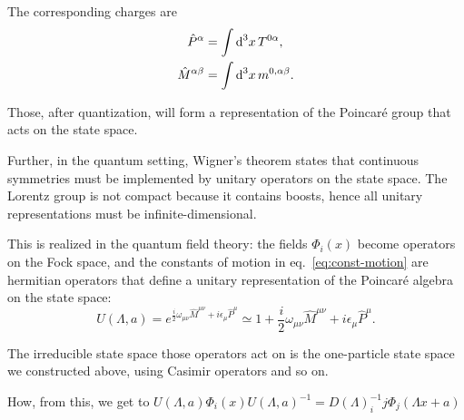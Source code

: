 The corresponding charges are
\begin{subequations}\label{eq:const-motion}
\begin{align}
    \hat{P}^\alpha &= \int {\mathop{}\!\mathrm{d}}^3 x \, T^{0\alpha} , \\
   \hat{M}^{\alpha\beta} &= \int {\mathop{}\!\mathrm{d}}^3 x \, m^{0 ,\alpha\beta} .
\end{align}
\end{subequations}

Those, after quantization, will form a representation of the Poincaré group that acts on the state space.

Further, in the quantum setting, Wigner's theorem states that continuous symmetries must be implemented by unitary operators on the state space. The Lorentz group is not compact because it contains boosts, hence all unitary representations must be infinite-dimensional. 

This is realized in the quantum field theory: the fields $\Phi_i(x)$ become operators on the Fock space, and the constants of motion in eq.~\eqref{eq:const-motion} are hermitian operators that define a unitary representation of the Poincaré algebra on the state space:
\begin{equation}
    U(\Lambda,a) = e^{\frac{i}{2} \omega_{\mu\nu} \hat{M}^{\mu\nu} + i \epsilon_\mu \hat{P}^\mu} \simeq 1 + \frac{i}{2} \omega_{\mu\nu} \hat{M}^{\mu\nu} + i \epsilon_\mu \hat{P}^\mu .
\end{equation}

The irreducible state space those operators act on is the one-particle state space we constructed above, using Casimir operators and so on.

\color{red} How, from this, we get to $U(\Lambda,a) \Phi_i(x) U(\Lambda,a)^{-1} = D(\Lambda)^{-1}_ij \Phi_j (\Lambda x + a)$
\color{black}

